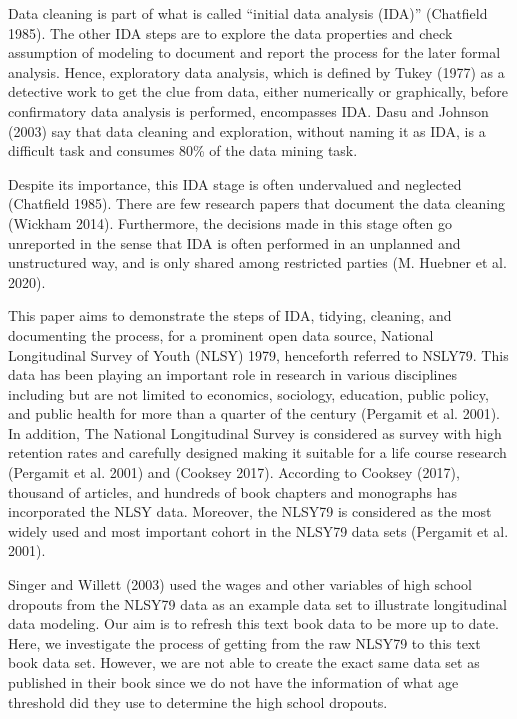 \documentclass{article}
\begin{document}
Data cleaning is part of what is called ``initial data analysis (IDA)'' (Chatfield 1985). The other IDA steps are to explore the data properties and check assumption of modeling to document and report the process for the later formal analysis. Hence, exploratory data analysis, which is defined by Tukey (1977) as a detective work to get the clue from data, either numerically or graphically, before confirmatory data analysis is performed, encompasses IDA. Dasu and Johnson (2003) say that data cleaning and exploration, without naming it as IDA, is a difficult task and consumes 80\% of the data mining task.

Despite its importance, this IDA stage is often undervalued and neglected (Chatfield 1985). There are few research papers that document the data cleaning (Wickham 2014). Furthermore, the decisions made in this stage often go unreported in the sense that IDA is often performed in an unplanned and unstructured way, and is only shared among restricted parties (M. Huebner et al. 2020).

This paper aims to demonstrate the steps of IDA, tidying, cleaning, and documenting the process, for a prominent open data source, National Longitudinal Survey of Youth (NLSY) 1979, henceforth referred to NSLY79. This data has been playing an important role in research in various disciplines including but are not limited to economics, sociology, education, public policy, and public health for more than a quarter of the century (Pergamit et al. 2001). In addition, The National Longitudinal Survey is considered as survey with high retention rates and carefully designed making it suitable for a life course research (Pergamit et al. 2001) and (Cooksey 2017). According to Cooksey (2017), thousand of articles, and hundreds of book chapters and monographs has incorporated the NLSY data. Moreover, the NLSY79 is considered as the most widely used and most important cohort in the NLSY79 data sets (Pergamit et al. 2001).

Singer and Willett (2003) used the wages and other variables of high school dropouts from the NLSY79 data as an example data set to illustrate longitudinal data modeling. Our aim is to refresh this text book data to be more up to date. Here, we investigate the process of getting from the raw NLSY79 to this text book data set. However, we are not able to create the exact same data set as published in their book since we do not have the information of what age threshold did they use to determine the high school dropouts.
\end{document}
